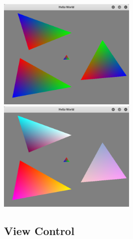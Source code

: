\documentclass[11pt]{article}
\begin{document}
\includegraphics[width=0.5\textwidth]{colorbefore.png}
\includegraphics[width=0.5\textwidth]{colorafter.png}

\subsection{View Control}
\end{document}
